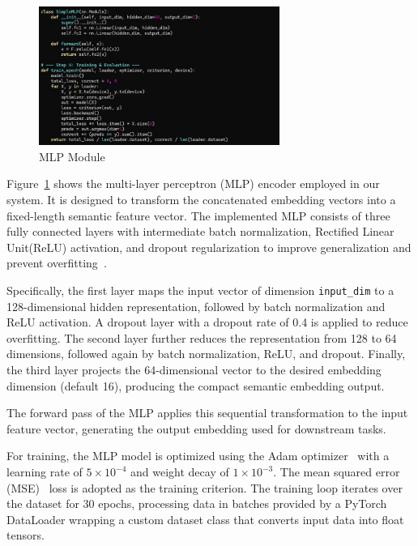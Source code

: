 \begin{ZhChapter}
    \begin{figure}[htbp]
        \centering
        \includegraphics[width = 0.7\textwidth]{image/MLP_code.jpg}
        \caption{MLP Module}
        \label{fig:MLP_code}
    \end{figure}

    Figure~\ref{fig:MLP_code} shows the multi-layer perceptron (MLP) encoder employed in our system. It is designed to transform the concatenated embedding vectors into a fixed-length semantic feature vector. The implemented MLP consists of three fully connected layers with intermediate batch normalization, Rectified Linear Unit(ReLU) activation, and dropout regularization to improve generalization and prevent overfitting~\cite{ioffe2015batch}.

    Specifically, the first layer maps the input vector of dimension \texttt{input\_dim} to a 128-dimensional hidden representation, followed by batch normalization and ReLU activation. A dropout layer with a dropout rate of 0.4 is applied to reduce overfitting. The second layer further reduces the representation from 128 to 64 dimensions, followed again by batch normalization, ReLU, and dropout. Finally, the third layer projects the 64-dimensional vector to the desired embedding dimension (default 16), producing the compact semantic embedding output.

    The forward pass of the MLP applies this sequential transformation to the input feature vector, generating the output embedding used for downstream tasks.

    For training, the MLP model is optimized using the Adam optimizer~\cite{zhang2018improved} with a learning rate of $5 \times 10^{-4}$ and weight decay of $1 \times 10^{-3}$. The mean squared error (MSE)~\cite{garcia2024review} loss is adopted as the training criterion. The training loop iterates over the dataset for 30 epochs, processing data in batches provided by a PyTorch DataLoader wrapping a custom dataset class that converts input data into float tensors.


\end{ZhChapter}
